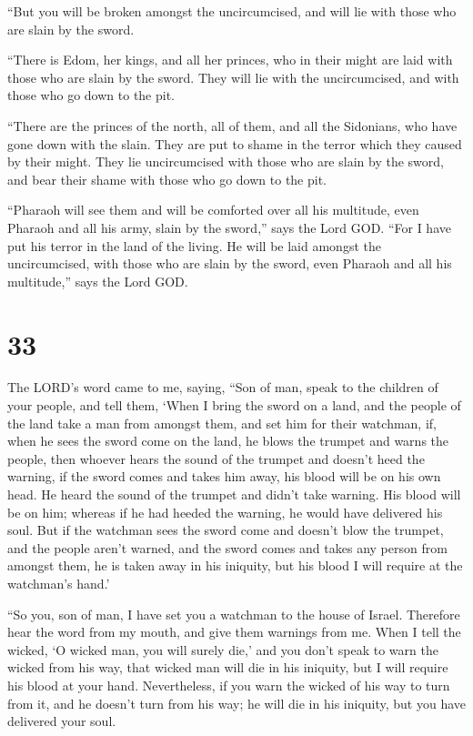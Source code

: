 ``But you will be broken amongst the uncircumcised, and
will lie with those who are slain by the sword.

 ``There is Edom, her kings, and all her princes, who in
their might are laid with those who are slain by the sword. They will
lie with the uncircumcised, and with those who go down to the pit.

 ``There are the princes of the north, all of them, and
all the Sidonians, who have gone down with the slain. They are put to
shame in the terror which they caused by their might. They lie
uncircumcised with those who are slain by the sword, and bear their
shame with those who go down to the pit.

 ``Pharaoh will see them and will be comforted over all
his multitude, even Pharaoh and all his army, slain by the sword,'' says
the Lord GOD.  ``For I have put his terror in the land of
the living. He will be laid amongst the uncircumcised, with those who
are slain by the sword, even Pharaoh and all his multitude,'' says the
Lord GOD.

\hypertarget{section-31}{%
\section{33}\label{section-31}}

 The LORD's word came to me, saying,  ``Son
of man, speak to the children of your people, and tell them, `When I
bring the sword on a land, and the people of the land take a man from
amongst them, and set him for their watchman,  if, when he
sees the sword come on the land, he blows the trumpet and warns the
people,  then whoever hears the sound of the trumpet and
doesn't heed the warning, if the sword comes and takes him away, his
blood will be on his own head.  He heard the sound of the
trumpet and didn't take warning. His blood will be on him; whereas if he
had heeded the warning, he would have delivered his soul. 
But if the watchman sees the sword come and doesn't blow the trumpet,
and the people aren't warned, and the sword comes and takes any person
from amongst them, he is taken away in his iniquity, but his blood I
will require at the watchman's hand.'

 ``So you, son of man, I have set you a watchman to the
house of Israel. Therefore hear the word from my mouth, and give them
warnings from me.  When I tell the wicked, `O wicked man,
you will surely die,' and you don't speak to warn the wicked from his
way, that wicked man will die in his iniquity, but I will require his
blood at your hand.  Nevertheless, if you warn the wicked
of his way to turn from it, and he doesn't turn from his way; he will
die in his iniquity, but you have delivered your soul.

